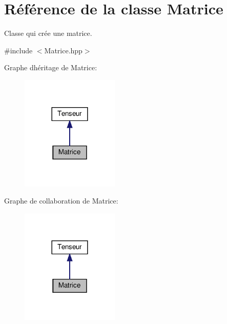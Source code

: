 \hypertarget{classMatrice}{}\section{Référence de la classe Matrice}
\label{classMatrice}


Classe qui crée une matrice.  




{\ttfamily \#include $<$Matrice.\+hpp$>$}



Graphe d\textquotesingle{}héritage de Matrice\+:
\nopagebreak
\begin{figure}[H]
\begin{center}
\leavevmode
\includegraphics[width=132pt]{classMatrice__inherit__graph}
\end{center}
\end{figure}


Graphe de collaboration de Matrice\+:
\nopagebreak
\begin{figure}[H]
\begin{center}
\leavevmode
\includegraphics[width=132pt]{classMatrice__coll__graph}
\end{center}
\end{figure}
